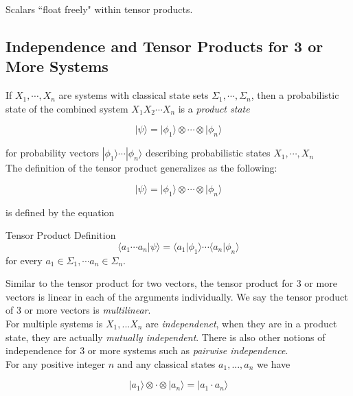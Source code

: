 \documentclass[svgnames]{article}     %
\begin{document}
Scalars ``float freely" within tensor products.

\subsection{Independence and Tensor Products for 3 or More Systems}

If $X_1, \cdots, X_n$ are systems with classical state sets $\Sigma_1, \cdots,
\Sigma_n$, then a probabilistic state of the combined system $X_1X_2\cdots
X_n$ is a \textit{product state}

 \[
|\psi\rangle = |\phi_1\rangle \otimes \cdots \otimes |\phi_n\rangle 
 \] \vspace{5px}
 
 
for probability vectors $|\phi_1\rangle \cdots |\phi_n\rangle $ describing
probabilistic states $X_1, \cdots, X_n$ \\
  
  
The definition of the tensor product generalizes as the following: 

\[
|\psi\rangle = |\phi_1\rangle \otimes \cdots \otimes |\phi_n\rangle 
\] \vspace{5px}

is defined by the equation 

\begin{subbox}{Tensor Product Definition}
\[
\langle a_1\cdots a_n | \psi \rangle = \langle a_1 | \phi_1\rangle \cdots
\langle a_n | \phi_n \rangle
\] \vspace{5px}
for every $a_1 \in \Sigma_1, \cdots a_n \in \Sigma_n$. 
\end{subbox}

Similar to the tensor product for two vectors, the tensor product for 3 or more
vectors is linear in each of the arguments individually. We say the tensor
product of 3 or more vectors is \textit{multilinear}. \\

For multiple systems is $X_1, ... X_n$ are \textit{independenet}, when they are
in a product state, they are actually \textit{mutually independent}. There is
also other notions of independence for 3 or more systems such as
\textit{pairwise independence}. \\

For any positive integer $n$ and any classical states $a_1, ... , a_n$ we have

\[
|a_1\rangle \otimes \cdot \otimes |a_n\rangle = |a_1\cdot a_n\rangle 
\] \vspace{5px}
\end{document}
